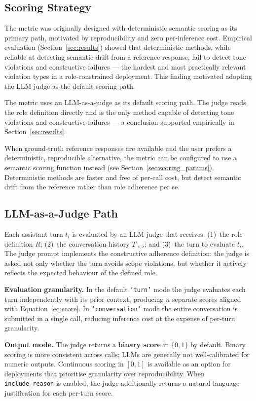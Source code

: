 \documentclass[11pt,a4paper]{article}
\begin{document}
\subsection{Scoring Strategy}

The metric was originally designed with deterministic semantic scoring as
its primary path, motivated by reproducibility and zero per-inference cost.
Empirical evaluation (Section~\ref{sec:results}) showed that deterministic
methods, while reliable at detecting semantic drift from a reference
response, fail to detect tone violations and constructive failures --- the
hardest and most practically relevant violation types in a role-constrained
deployment. This finding motivated adopting the LLM judge as the default
scoring path.

The metric uses an LLM-as-a-judge as its default scoring path. The judge
reads the role definition directly and is the only method capable of
detecting tone violations and constructive failures --- a conclusion
supported empirically in Section~\ref{sec:results}.

When ground-truth reference responses are available and the user prefers
a deterministic, reproducible alternative, the metric can be configured
to use a semantic scoring function instead (see Section~\ref{sec:scoring_params}).
Deterministic methods are faster and free of per-call cost, but detect
semantic drift from the reference rather than role adherence per se.

\subsection{LLM-as-a-Judge Path}

Each assistant turn $t_i$ is evaluated by an LLM judge that receives:
(1)~the role definition $R$; (2)~the conversation history $T_{<i}$; and
(3)~the turn to evaluate $t_i$. The judge prompt implements the constructive
adherence definition: the judge is asked not only whether the turn avoids
scope violations, but whether it actively reflects the expected behaviour
of the defined role.

\textbf{Evaluation granularity.} In the default \texttt{'turn'} mode the
judge evaluates each turn independently with its prior context, producing
$n$ separate scores aligned with Equation~\ref{eq:score}. In
\texttt{'conversation'} mode the entire conversation is submitted in a
single call, reducing inference cost at the expense of per-turn granularity.

\textbf{Output mode.} The judge returns a \textbf{binary score} in
$\{0, 1\}$ by default. Binary scoring is more consistent across calls;
LLMs are generally not well-calibrated for numeric outputs. Continuous
scoring in $[0, 1]$ is available as an option for deployments that
prioritise granularity over reproducibility. When \texttt{include\_reason}
is enabled, the judge additionally returns a natural-language justification
for each per-turn score.
\end{document}
